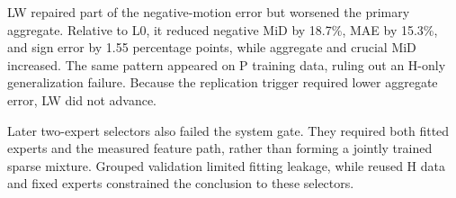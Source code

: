 

LW repaired part of the negative-motion error but worsened the primary aggregate. Relative to L0, it reduced negative MiD by 18.7\%, MAE by 15.3\%, and sign error by 1.55 percentage points, while aggregate and crucial MiD increased. The same pattern appeared on P training data, ruling out an H-only generalization failure. Because the replication trigger required lower aggregate error, LW did not advance. 

Later two-expert selectors also failed the system gate. They required both fitted experts and the measured feature path, rather than forming a jointly trained sparse mixture. Grouped validation limited fitting leakage, while reused H data and fixed experts constrained the conclusion to these selectors.
\FloatBarrier
